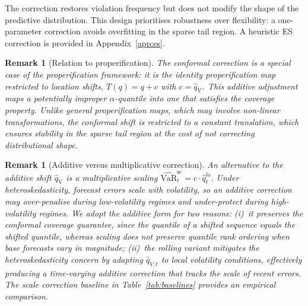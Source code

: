 \documentclass[preprint,11pt,authoryear]{elsarticle}
\newtheorem{remark}[theorem]{Remark}
\newcommand{\VaR}{\mathrm{VaR}}
\newcommand{\1}{\boldsymbol{1}}
\newcommand{\qV}{\hat{q}_{\scriptscriptstyle\mathrm{V}}}
\begin{document}
	The correction restores violation frequency but does not
	modify the shape of the predictive distribution. This design
	prioritises robustness over flexibility: a one-parameter
	correction avoids overfitting in the sparse tail region. A
	heuristic ES correction is provided in
	Appendix~\ref{app:es}.
	
	\begin{remark}[Relation to properification]
		The conformal correction is a special case of the
		\citet{brehmer2021properification} properification framework:
		it is the identity properification map restricted to location
		shifts, $T(q) = q + c$ with $c = \qV$. This additive
		adjustment maps a potentially improper $\alpha$-quantile into
		one that satisfies the coverage property. Unlike general
		properification maps, which may involve non-linear
		transformations, the conformal shift is restricted to a
		constant translation, which ensures stability in the
		sparse tail region at the cost of not correcting
		distributional shape.
	\end{remark}
	
	\begin{remark}[Additive versus multiplicative correction]
		An alternative to the additive shift $\qV$ is a
		multiplicative scaling
		$\widehat{\VaR}_t^{\mathrm{sc}} = c \cdot
		\hat{q}_t^{lo}$. Under heteroskedasticity, forecast errors
		scale with volatility, so an additive correction may
		over-penalise during low-volatility regimes and
		under-protect during high-volatility regimes. We adopt the
		additive form for two reasons: (i)~it preserves the
		conformal coverage guarantee, since the quantile of a
		shifted sequence equals the shifted quantile, whereas
		scaling does not preserve quantile rank ordering when base
		forecasts vary in magnitude; (ii)~the rolling variant
		mitigates the heteroskedasticity concern by adapting
		$\hat{q}_{V,t}$ to local volatility conditions, effectively
		producing a time-varying additive correction that tracks the
		scale of recent errors. The scale correction baseline in
		Table~\ref{tab:baselines} provides an empirical comparison.
	\end{remark}
\end{document}
